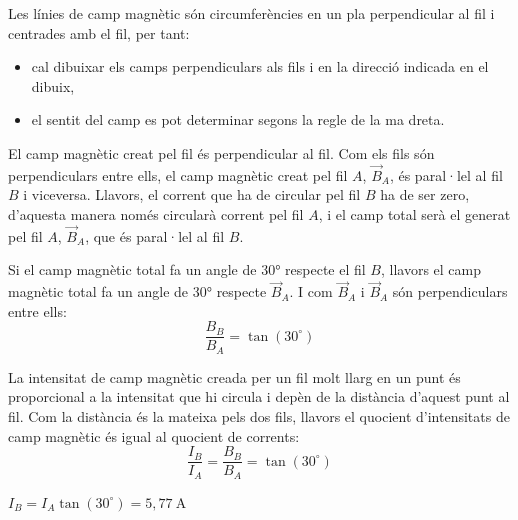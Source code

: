 \begin{solapartat}

\noindent\begin{minipage}[c]{0.66\linewidth}
\end{minipage}\hfill
\begin{minipage}[c]{0.3\linewidth}
\end{minipage}

Les línies de camp magnètic són circumferències en un pla perpendicular al fil i centrades amb el fil, per tant:
\begin{itemize}
  \item cal dibuixar els camps perpendiculars als fils i en la direcció indicada en el dibuix,
  \item el sentit del camp es pot determinar segons la regle de la ma dreta.
\end{itemize}

 El camp magnètic creat pel fil és perpendicular al fil. Com els fils són perpendiculars entre ells, el camp magnètic creat pel fil $A$, $\vec{B}_A$, és paral·lel al fil $B$ i viceversa. Llavors, el corrent que ha de circular pel fil $B$ ha de ser zero, d'aquesta manera només circularà corrent pel fil $A$, i el camp total serà el generat pel fil $A$, $\vec{B}_A$, que és paral·lel al fil $B$.
\end{solapartat}

\begin{solapartat}
 Si el camp magnètic total fa un angle de 30° respecte el fil $B$, llavors el camp magnètic total fa un angle de 30° respecte $\vec{B}_A$. I com $\vec{B}_A$ i $\vec{B}_A$ són perpendiculars entre ells:
\[ \frac{B_B}{B_A} = \tan(30^\circ) \]

 La intensitat de camp magnètic creada per un fil molt llarg en un punt és proporcional a la intensitat que hi circula i depèn de la distància d'aquest punt al fil. Com la distància és la mateixa pels dos fils, llavors el quocient d'intensitats de camp magnètic és igual al quocient de corrents:
\[ \frac{I_B}{I_A} = \frac{B_B}{B_A} = \tan(30^\circ) \]

 $I_B = I_A\tan(30^\circ) = 5,77\ \mathrm{A}$
\end{solapartat}
